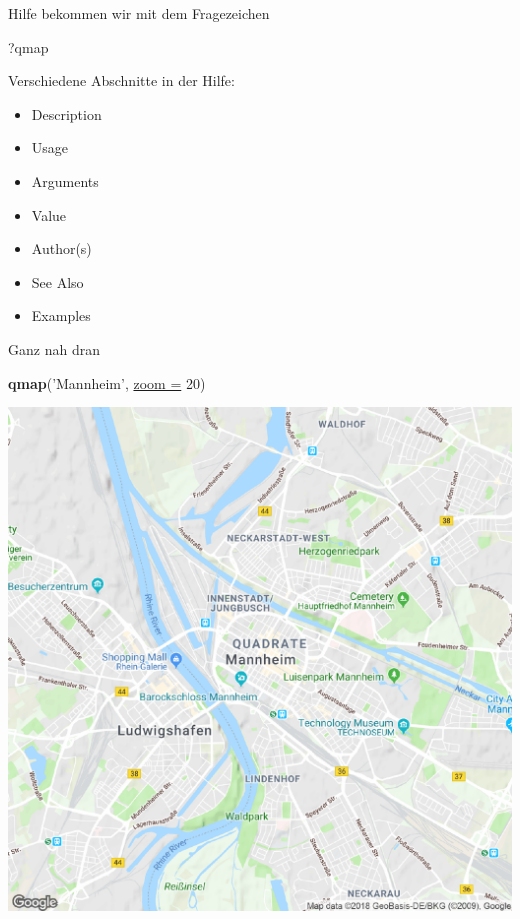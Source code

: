 \documentclass[ignorenonframetext,]{beamer}
\newenvironment{Shaded}{\begin{snugshade}}{\end{snugshade}}
\newcommand{\DataTypeTok}[1]{\textcolor[rgb]{0.74,0.68,0.62}{\underline{#1}}}
\newcommand{\DecValTok}[1]{\textcolor[rgb]{0.27,0.67,0.26}{#1}}
\newcommand{\KeywordTok}[1]{\textcolor[rgb]{0.26,0.66,0.93}{\textbf{#1}}}
\newcommand{\NormalTok}[1]{\textcolor[rgb]{0.74,0.68,0.62}{#1}}
\newcommand{\StringTok}[1]{\textcolor[rgb]{0.02,0.61,0.04}{#1}}
\providecommand{\tightlist}{%
  \setlength{\itemsep}{0pt}\setlength{\parskip}{0pt}}
\begin{document}
\begin{frame}[fragile]{Hilfe bekommen wir mit dem Fragezeichen}
\protect\hypertarget{hilfe-bekommen-wir-mit-dem-fragezeichen}{}

\begin{Shaded}
\begin{Highlighting}[]
\NormalTok{?qmap}
\end{Highlighting}
\end{Shaded}

Verschiedene Abschnitte in der Hilfe:

\begin{itemize}
\tightlist
\item
  Description
\item
  Usage
\item
  Arguments
\item
  Value
\item
  Author(s)
\item
  See Also
\item
  Examples
\end{itemize}

\end{frame}

\begin{frame}[fragile]{Ganz nah dran}
\protect\hypertarget{ganz-nah-dran}{}

\begin{Shaded}
\begin{Highlighting}[]
\KeywordTok{qmap}\NormalTok{(}\StringTok{'Mannheim'}\NormalTok{, }\DataTypeTok{zoom =} \DecValTok{20}\NormalTok{)}
\end{Highlighting}
\end{Shaded}

\includegraphics{figure/ham_map_z20.pdf}

\end{frame}
\end{document}
